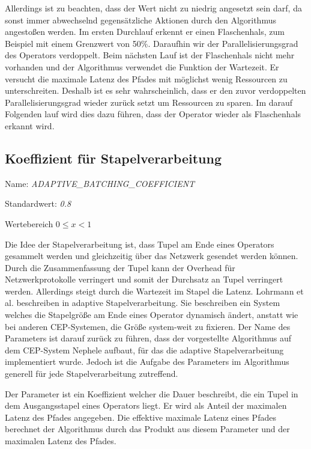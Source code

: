 Allerdings ist zu beachten, dass der Wert nicht zu niedrig angesetzt sein darf, da sonst immer abwechselnd gegensätzliche Aktionen durch den Algorithmus angestoßen werden.
Im ersten Durchlauf erkennt er einen Flaschenhals, zum Beispiel mit einem Grenzwert von 50\%.
Daraufhin wir der Parallelisierungsgrad des Operators verdoppelt.
Beim nächsten Lauf ist der Flaschenhals nicht mehr vorhanden und der Algorithmus verwendet die Funktion der Wartezeit.
Er versucht die maximale Latenz des Pfades mit möglichst wenig Ressourcen zu unterschreiten.
Deshalb ist es sehr wahrscheinlich, dass er den zuvor verdoppelten Parallelisierungsgrad wieder zurück setzt um Ressourcen zu sparen.
Im darauf Folgenden lauf wird dies dazu führen, dass der Operator wieder als Flaschenhals erkannt wird.

\subsection{Koeffizient für Stapelverarbeitung}

Name: \textit{ADAPTIVE\_BATCHING\_COEFFICIENT}

Standardwert: \textit{0.8}

Wertebereich \textit{\(0 \leq x < 1\)}

Die Idee der Stapelverarbeitung ist, dass Tupel am Ende eines Operators gesammelt werden und gleichzeitig über das Netzwerk gesendet werden können.
Durch die Zusammenfassung der Tupel kann der Overhead für Netzwerkprotokolle verringert und somit der Durchsatz an Tupel verringert werden.
Allerdings steigt durch die Wartezeit im Stapel die Latenz.
Lohrmann et al. beschreiben in \cite{lohrmann_nephele_2014} adaptive Stapelverarbeitung.
Sie beschreiben ein System welches die Stapelgröße am Ende eines Operator dynamisch ändert, anstatt wie bei anderen CEP-Systemen, die Größe system-weit zu fixieren.
Der Name des Parameters ist darauf zurück zu führen, dass der vorgestellte Algorithmus auf dem CEP-System Nephele aufbaut, für das die adaptive Stapelverarbeitung implementiert wurde.
Jedoch ist die Aufgabe des Parameters im Algorithmus generell für jede Stapelverarbeitung zutreffend.

Der Parameter ist ein Koeffizient welcher die Dauer beschreibt, die ein Tupel in dem Ausgangsstapel eines Operators liegt.
Er wird als Anteil der maximalen Latenz des Pfades angegeben.
Die effektive maximale Latenz eines Pfades berechnet der Algorithmus durch das Produkt aus diesem Parameter und der maximalen Latenz des Pfades.

